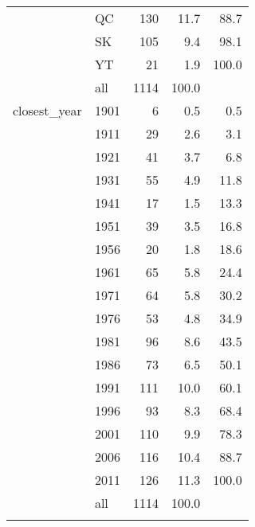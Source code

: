 \begin{longtable}{ll|rrr}
   & QC & 130 & 11.7 & 88.7 \\ 
   & SK & 105 & 9.4 & 98.1 \\ 
   & YT & 21 & 1.9 & 100.0 \\ 
   \hline
 & all & 1114 & 100.0 &  \\ 
   \hline
\hline
closest\_year & 1901 & 6 & 0.5 & 0.5 \\ 
   & 1911 & 29 & 2.6 & 3.1 \\ 
   & 1921 & 41 & 3.7 & 6.8 \\ 
   & 1931 & 55 & 4.9 & 11.8 \\ 
   & 1941 & 17 & 1.5 & 13.3 \\ 
   & 1951 & 39 & 3.5 & 16.8 \\ 
   & 1956 & 20 & 1.8 & 18.6 \\ 
   & 1961 & 65 & 5.8 & 24.4 \\ 
   & 1971 & 64 & 5.8 & 30.2 \\ 
   & 1976 & 53 & 4.8 & 34.9 \\ 
   & 1981 & 96 & 8.6 & 43.5 \\ 
   & 1986 & 73 & 6.5 & 50.1 \\ 
   & 1991 & 111 & 10.0 & 60.1 \\ 
   & 1996 & 93 & 8.3 & 68.4 \\ 
   & 2001 & 110 & 9.9 & 78.3 \\ 
   & 2006 & 116 & 10.4 & 88.7 \\ 
   & 2011 & 126 & 11.3 & 100.0 \\ 
   \hline
 & all & 1114 & 100.0 &  \\ 
   \hline
\hline
\hline
\caption{} 
\label{}
\end{longtable}
\endgroup

